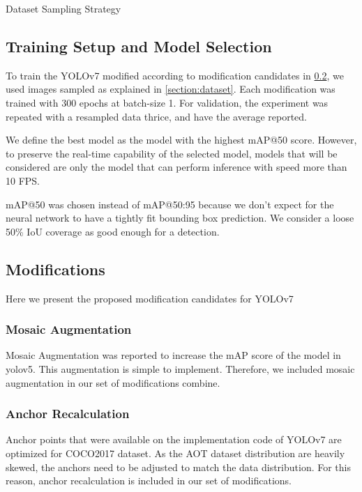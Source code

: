 \documentclass[conference]{IEEEtran}
\begin{document}
\begin{table}[htbp]
  \centering
  \caption{Dataset Sampling Strategy}
  \label{tbl:datasetsamplingdist}
  
\end{table}

\subsection{Training Setup and Model Selection}
To train the YOLOv7 modified according to modification candidates in \ref{section:modifications},
we used images sampled as explained in \ref{section:dataset}. Each modification  was trained with 300 epochs at batch-size 1.
For validation, the experiment was repeated with a resampled data thrice, and have the average reported.

We define the best model as the model with the highest mAP@50 score.
However, to preserve the real-time capability of the selected model, models that will be considered
are only the model that can perform inference with speed more than 10 FPS.

mAP@50 was chosen instead of mAP@50:95 because we don't expect for the neural network to have a tightly fit bounding box prediction.
We consider a loose 50\% IoU coverage as good enough for a detection.

\subsection{Modifications}
\label{section:modifications}
Here we present the proposed modification candidates for YOLOv7

\subsubsection{Mosaic Augmentation}
Mosaic Augmentation was reported to increase the mAP score of the model in
\cite{yolov4}{yolov5}. This augmentation is simple to implement. Therefore,
we included mosaic augmentation in our set of modifications combine.

\subsubsection{Anchor Recalculation}
Anchor points that were available on the implementation code of YOLOv7
are optimized for COCO2017 dataset. As the AOT dataset distribution
are heavily skewed, the anchors need to be adjusted to match the data distribution.
For this reason, anchor recalculation is included in our set of modifications.
\end{document}
